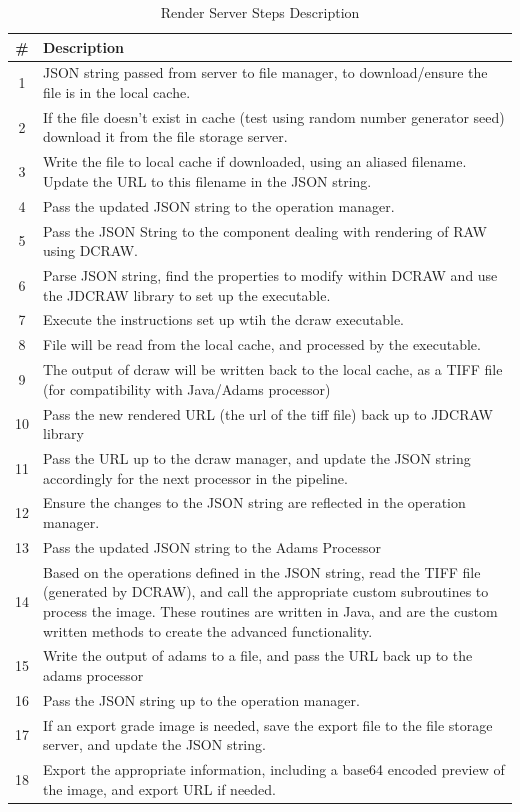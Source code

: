 \documentclass[12pt,a4paper]{article}
\begin{document}
\begin{table}
  \centering
  \begin{tabular}{| c | p{13cm} | }
    \hline
    \textbf{\#} & \textbf{Description} \\
    \hline
  1 & JSON string passed from server to file manager, to download/ensure the file is in the local cache. \\
  \hline
  2 & If the file doesn't exist in cache (test using random number generator seed) download it from the file storage server. \\
  \hline
  3 & Write the file to local cache if downloaded, using an aliased filename. Update the URL to this filename in the JSON string. \\
  \hline
  4 & Pass the updated JSON string to the operation manager. \\
  \hline
  5 & Pass the JSON String to the component dealing with rendering of RAW using DCRAW. \\
  \hline
  6 & Parse JSON string, find the properties to modify within DCRAW and use the JDCRAW library to set up the executable.\\
  \hline
  7 & Execute the instructions set up wtih the dcraw executable.\\
  \hline
  8 & File will be read from the local cache, and processed by the executable.\\
  \hline
  9 & The output of dcraw will be written back to the local cache, as a TIFF file (for compatibility with Java/Adams processor)\\
  \hline
  10 & Pass the new rendered URL (the url of the tiff file) back up to JDCRAW library\\
  \hline
  11 & Pass the URL up to the dcraw manager, and update the JSON string accordingly for the next processor in the pipeline.\\
  \hline
  12 & Ensure the changes to the JSON string are reflected in the operation manager.\\
  \hline
  13 & Pass the updated JSON string to the Adams Processor\\
  \hline
  14 & Based on the operations defined in the JSON string, read the TIFF file (generated by DCRAW), and call the appropriate custom subroutines
       to process the image. These routines are written in Java, and are the custom written methods to create the advanced functionality.\\
  \hline
  15 & Write the output of adams to a file, and pass the URL back up to the adams processor\\
  \hline
  16 & Pass the JSON string up to the operation manager.\\
  \hline
  17 & If an export grade image is needed, save the export file to the file storage server, and update the JSON string.\\
  \hline
  18 & Export the appropriate information, including a base64 encoded preview of the image, and export URL if needed.\\
  \hline
  \end{tabular}
  \caption{Render Server Steps Description}
  \label{RenderServerDiagramTable}
\end{table}
\end{document}
